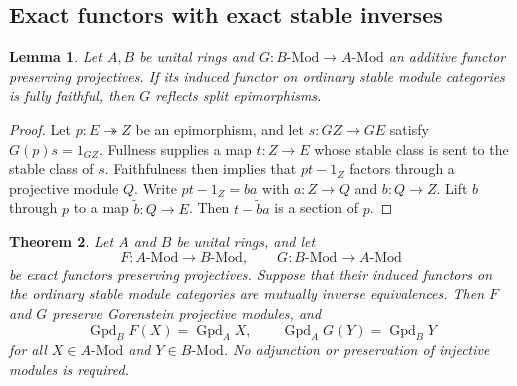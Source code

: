 \documentclass[12pt,a4paper,english,reqno]{amsart}
\numberwithin{equation}{section}
\theoremstyle{plain}
\newtheorem{theorem}{Theorem}[section]
\newtheorem{lemma}[theorem]{Lemma}
\theoremstyle{definition}
\begin{document}
\subsection{Exact functors with exact stable inverses}

\begin{lemma}
\label{lem:stable-full-faithful-reflects-split-epi}
Let $A,B$ be unital rings and
$G:B\text{-}\mathrm{Mod}\to A\text{-}\mathrm{Mod}$ an additive
functor preserving projectives.  If its induced functor on ordinary
stable module categories is fully faithful, then $G$ reflects split
epimorphisms.
\end{lemma}

\begin{proof}
Let $p:E\twoheadrightarrow Z$ be an epimorphism, and let
$s:GZ\to GE$ satisfy $G(p)s=1_{GZ}$.  Fullness supplies a map $t:Z\to E$
whose stable class is sent to the stable class of $s$.  Faithfulness
then implies that $pt-1_Z$ factors through a projective module $Q$.
Write $pt-1_Z=ba$ with $a:Z\to Q$ and $b:Q\to Z$.  Lift $b$ through
$p$ to a map $\widetilde b:Q\to E$.  Then
$t-\widetilde b a$ is a section of $p$.
\end{proof}

\begin{theorem}
\label{thm:gpd-exact-stable-pair}
Let $A$ and $B$ be unital rings, and let
\[
 F:A\text{-}\mathrm{Mod}\to B\text{-}\mathrm{Mod},\qquad
 G:B\text{-}\mathrm{Mod}\to A\text{-}\mathrm{Mod}
\]
be exact functors preserving projectives.  Suppose that their induced
functors on the ordinary stable module categories are mutually inverse
equivalences.  Then $F$ and $G$ preserve Gorenstein projective modules,
and
\[
 \operatorname{Gpd}_B F(X)=\operatorname{Gpd}_A X,
 \qquad
 \operatorname{Gpd}_A G(Y)=\operatorname{Gpd}_B Y
\]
for all $X\in A\text{-}\mathrm{Mod}$ and $Y\in B\text{-}\mathrm{Mod}$.
No adjunction or preservation of injective modules is required.
\end{theorem}
\end{document}
